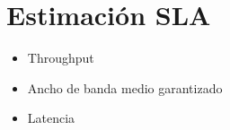 \section{Estimación SLA}\label{sec:SLA}
\begin{itemize}
\item Throughput
\item Ancho de banda medio garantizado
\item Latencia
\end{itemize}
